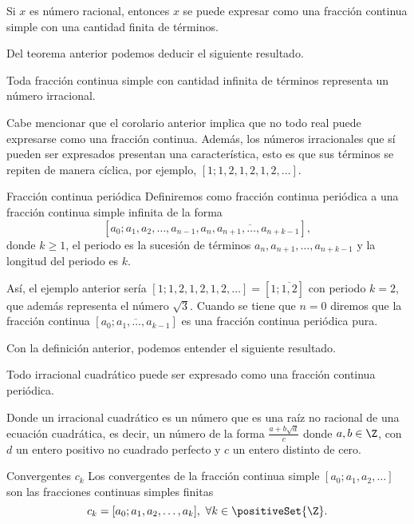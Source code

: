 \begin{theorem.box}{}{}
    Si $x$ es número racional, entonces $x$ se puede expresar como una fracción continua simple con una cantidad finita de términos.
\end{theorem.box}

Del teorema anterior podemos deducir el siguiente resultado.

\begin{corollary}
    Toda fracción continua simple con cantidad infinita de términos representa un número irracional.
\end{corollary}

Cabe mencionar que el corolario anterior implica que no todo real puede expresarse como una fracción continua.
Además, los números irracionales que sí pueden ser expresados presentan una característica, esto es que sus términos
se repiten de manera cíclica, por ejemplo, $[1; 1, 2,1,2,1,2, \ldots]$.

\begin{definition.box}{Fracción continua periódica}{}
    Definiremos como fracción continua periódica a una fracción continua simple infinita de la forma
    \[
        [a_0; a_1, a_2, \ldots, a_{n -1}, \overline{a_n, a_{n + 1},\ldots, a_{n + k - 1}}],
    \]
    donde $k \geq 1$, el periodo es la sucesión de términos $a_{n}, a_{n + 1},\ldots, a_{n + k  - 1}$ y la longitud del periodo es $k$.
\end{definition.box}

Así, el ejemplo anterior sería $[1; 1, 2,1,2,1,2, \ldots] = [1; \overline{1,2}]$ con periodo $k = 2$, que además representa el número $\sqrt {3}$.
Cuando se tiene que $n = 0$ diremos que la fracción continua $[\overline{a_0;a_1, \ldots, a_{k - 1}}]$ es una fracción continua periódica pura.

Con la definición anterior, podemos entender el siguiente resultado.

\begin{theorem.box}{}{}
    Todo irracional cuadrático puede ser expresado como una fracción continua periódica.
\end{theorem.box}

Donde un irracional cuadrático es un número que es una raíz no racional de una ecuación cuadrática, es decir, un número de la forma $\frac{a + b\sqrt {d}}{c}$ donde $a,b \in \Z$, con $d$ un entero positivo no cuadrado perfecto y $c$ un entero distinto de cero.

\begin{definition.box}{Convergentes $c_k$}{}
    Los convergentes de la fracción continua simple $[a_0; a_1, a_2, \ldots]$ son las fracciones continuas simples finitas
    \[
        c_k = [a_0; a_1, a_2, \ldots, a_k],\ \forall k \in \positiveSet{\Z}.
    \]
\end{definition.box}

